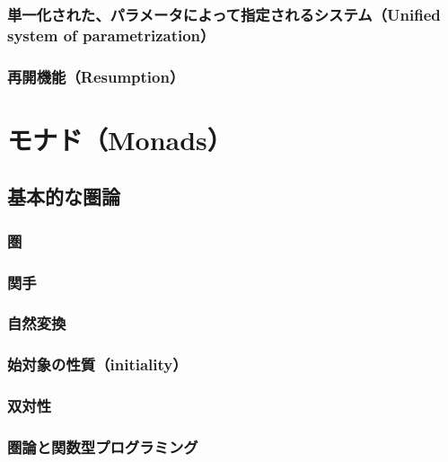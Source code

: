 \documentclass[11pt, oneside]{jsarticle}   	%
\begin{document}








\subsubsection{単一化された、パラメータによって指定されるシステム（Unified system of parametrization）}
\subsubsection{再開機能（Resumption）}

\section{ モナド（Monads）}
\subsection{基本的な圏論}
\subsubsection{ 圏 }
\subsubsection{ 関手 }
\subsubsection{ 自然変換 }
\subsubsection{ 始対象の性質（initiality）}
\subsubsection{ 双対性 }
\subsubsection{ 圏論と関数型プログラミング }
\end{document}
